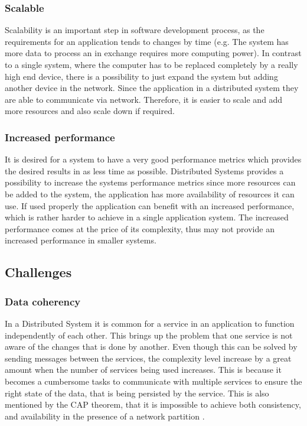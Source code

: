         \subsubsection{Scalable}
        Scalability is an important step in software development process, as the requirements for an application tends to changes by time 
        (e.g. The system has more data to process an in exchange requires more computing power). In contrast to a single system, where the computer 
        has to be replaced completely by a really high end device, there is a possibility to just expand the system but adding another device in the network.
        Since the application in a distributed system they are able to communicate via network. Therefore, it is easier to scale and add more resources and 
        also scale down if required. 

        \subsubsection{Increased performance}
        It is desired for a system to have a very good performance metrics which provides the desired results in as less time as possible.
        Distributed Systems provides a possibility to increase the systems performance metrics since more resources can be added to the system,
        the application has more availability of resources it can use. If used properly the application can benefit with an increased performance, 
        which is rather harder to achieve in a single application system. The increased performance comes at the price of its complexity, thus 
        may not provide an increased performance in smaller systems.
    
    \subsection{Challenges}    
        \label{subsection: distriChallenges}
        \subsubsection{Data coherency}
        In a Distributed System it is common for a service in an application to function independently of each other. This brings up the problem that
        one service is not aware of the changes that is done by another. Even though this can be solved by sending messages between the services, the complexity
        level increase by a great amount when the number of services being used increases. This is because it becomes a cumbersome tasks to communicate with
        multiple services to ensure the right state of the data, that is being persisted by the service. This is also mentioned by the CAP theorem, that it is
        impossible to achieve both consistency, and availability in the presence of a network partition \cite[p.~59]{CAP}.

